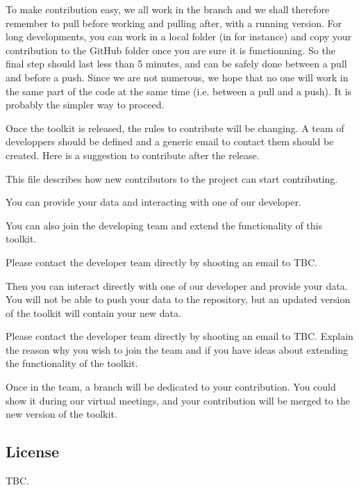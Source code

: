 \documentclass[letterpaper,10pt,english]{sphinxmanual}
\begin{document}
\sphinxAtStartPar
To make contribution easy, we all work in the  branch and we shall therefore remember to pull before working and pulling after, with a running version. For long developments, you can work in a local folder (in  for instance) and copy your contribution to the GitHub folder once you are sure it is functionning. So the final step should last less than 5 minutes, and can be safely done between a pull and before a push. Since we are not numerous, we hope that no one will work in the same part of the code at the same time (i.e. between a pull and a push). It is probably the simpler way to proceed.

\sphinxAtStartPar
Once the toolkit is released, the rules to contribute will be changing. A team of developpers should be defined and a generic email to contact them should be created. Here is a suggestion to contribute after the release.

\sphinxAtStartPar
This file describes how new contributors to the project can start contributing.

\sphinxAtStartPar
{}

\sphinxAtStartPar
You can provide your data and interacting with one of our developer.

\sphinxAtStartPar
You can also join the developing team and extend the functionality of this toolkit.

\sphinxAtStartPar
{}

\sphinxAtStartPar
Please contact the developer team directly by shooting an email to TBC.

\sphinxAtStartPar
Then you can interact directly with one of our developer and provide your data. You will not be able to push your data to the repository, but an updated version of the toolkit will contain your new data.

\sphinxAtStartPar
{}

\sphinxAtStartPar
Please contact the developer team directly by shooting an email to TBC. Explain the reason why you wish to join the team and if you have ideas about extending the functionality of the toolkit.

\sphinxAtStartPar
Once in the team, a branch will be dedicated to your contribution. You could show it during our virtual meetings, and your contribution will be merged to the new version of the toolkit.


\subsection{License}
\label{\detokenize{source/miscelaneous:license}}\label{\detokenize{source/miscelaneous:id2}}
\sphinxAtStartPar
TBC.
\end{document}
